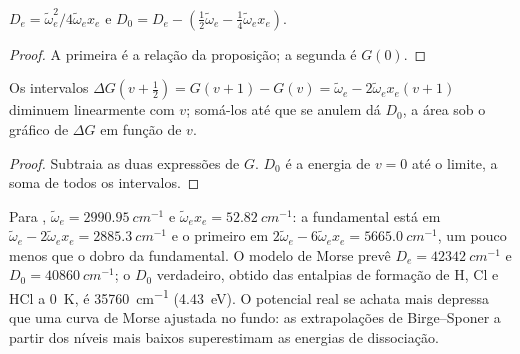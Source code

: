 \begin{corollary}\label{cor:b3:rovibrational-spectroscopy:de}
$D_e = \tilde\omega_e^2/4\tilde\omega_ex_e$ e $D_0 = D_e - (\frac12\tilde\omega_e -
\frac14\tilde\omega_ex_e)$.
\end{corollary}

\begin{proof}
A primeira é a relação da proposição; a segunda é $G(0)$.
\end{proof}

\begin{proposition}\label{prop:b3:rovibrational-spectroscopy:birge-sponer}
Os intervalos $\Delta G(v + \frac12) = G(v+1) - G(v) = \tilde\omega_e - 2\tilde\omega_ex_e(v +
1)$ diminuem linearmente com $v$; somá-los até que se anulem dá $D_0$, a
área sob o gráfico de $\Delta G$ em função de $v$.
\end{proposition}

\begin{proof}
Subtraia as duas expressões de $G$. $D_0$ é a energia de $v = 0$ até o
limite, a soma de todos os intervalos.
\end{proof}

\begin{example}\label{ex:b3:rovibrational-spectroscopy:hcl}
Para , $\tilde\omega_e = \qty{2990.95}{cm^{-1}}$ e $\tilde\omega_ex_e =
\qty{52.82}{cm^{-1}}$: a fundamental está em $\tilde\omega_e - 2\tilde\omega_ex_e =
\qty{2885.3}{cm^{-1}}$ e o primeiro  em $2\tilde\omega_e - 6\tilde\omega_ex_e =
\qty{5665.0}{cm^{-1}}$, um pouco menos que o dobro da fundamental. O modelo de Morse
prevê $D_e = \qty{42342}{cm^{-1}}$ e $D_0 = \qty{40860}{cm^{-1}}$; o $D_0$ verdadeiro,
obtido das entalpias de formação de H, Cl e HCl a \qty{0}{K}, é
\qty{35760}{cm^{-1}} (\qty{4.43}{eV}). O potencial real se achata mais depressa que uma
curva de Morse ajustada no fundo: as extrapolações de Birge--Sponer a partir dos
níveis mais baixos superestimam as energias de dissociação.
\end{example}

